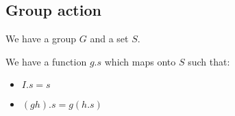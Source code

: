 
\subsection{Group action}

We have a group \(G\) and a set \(S\).

We have a function \(g.s\) which maps onto \(S\) such that:

\begin{itemize}
\item \(I.s=s\)
\item \((gh).s=g(h.s)\)
\end{itemize}

